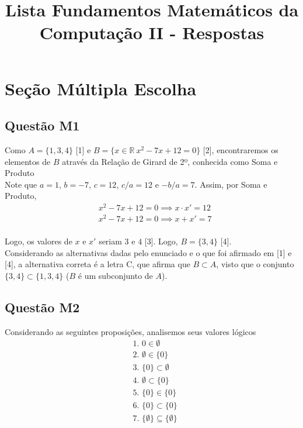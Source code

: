 \documentclass{article}
\title{Lista Fundamentos Matemáticos da Computação II - Respostas}
\begin{document}
\maketitle

\section{Seção Múltipla Escolha}

\subsection{Questão M1} 
Como $A = \{1, 3, 4\}$ [1] e $B = \{ x \in \mathbb{R} \ x^2 - 7x + 12 = 0\}$ [2], encontraremos os elementos de $B$ através da Relação de Girard de 2º, conhecida como Soma e Produto \\

Note que $a = 1$, $b = - 7$, $c = 12$, $c/a = 12$ e $-b/a = 7$. Assim, por Soma e Produto,
\[
\begin{aligned}
& x^2 - 7x + 12 = 0 \implies x \cdot x' = 12 \\
&x^2 - 7x + 12 = 0 \implies x + x' = 7 \\  
\end{aligned}
\]

Logo, os valores de $x$ e $x'$ seriam $3$ e $4$ [3]. Logo, $B = \{3, 4\}$ [4]. \\
Considerando as alternativas dadas pelo enunciado e o que foi afirmado em [1] e [4], a alternativa correta é a letra C, que afirma que $B \subset A$, visto que o conjunto $\{3, 4\} \subset \{1, 3, 4\}$ ($B$ é um subconjunto de $A$).


\subsection{Questão M2}
Considerando as seguintes proposições, analisemos seus valores lógicos 
\[
\begin{aligned}
& \text{1. } 0 \in \emptyset \\
& \text{2. } \emptyset \in \{0\} \\
& \text{3. } \{0\} \subset \emptyset\\
& \text{4. } \emptyset \subset \{0\} \\
& \text{5. } \{0\} \in \{0\} \\
& \text{6. } \{0\} \subset \{0\} \\
& \text{7. } \{\emptyset\} \subseteq \{\emptyset\}
\end{aligned}
\]
\end{document}
